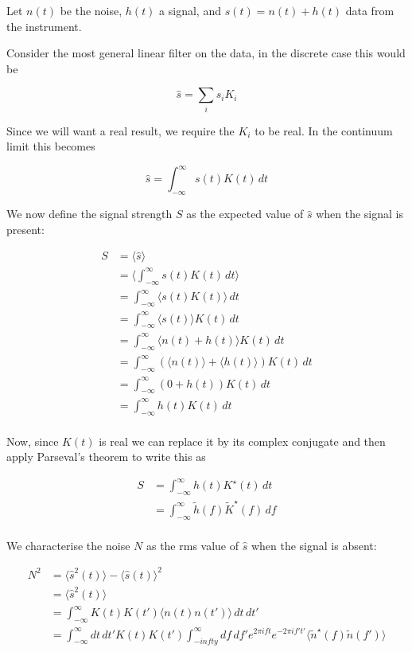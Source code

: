 
Let $n(t)$ be the noise, $h(t)$ a signal, and $s(t)=n(t)+h(t)$ data
from the instrument.

Consider the most general linear filter on the data, in the discrete
case this would be

\begin{equation}
\hat{s} = \sum_i s_i K_i
\end{equation}

Since we will want a real result, we require the $K_i$ to be real.  In
the continuum limit this becomes

\begin{equation}
\hat{s} = \int_{-\infty}^\infty s(t) K(t)\, dt
\end{equation}

We now define the signal strength $S$ as the expected value of
$\hat{s}$ when the signal is present:

\begin{align}
S &= \langle \hat{s} \rangle \\
&= \langle  \int_{-\infty}^\infty s(t) K(t)\, dt \rangle \\
&= \int_{-\infty}^\infty \langle s(t) K(t)\rangle \, dt \\
&= \int_{-\infty}^\infty \langle s(t) \rangle K(t) \, dt \\
&= \int_{-\infty}^\infty \langle n(t) + h(t) \rangle K(t) \, dt \\
&= \int_{-\infty}^\infty \left( \langle n(t) \rangle + \langle h(t)
\rangle \right)  K(t) \, dt \\
&= \int_{-\infty}^\infty \left( 0 + h(t) \right)  K(t) \, dt \\
&= \int_{-\infty}^\infty h(t) K(t) \, dt \\
\end{align}

Now, since $K(t)$ is real we can replace it by its complex conjugate
and then apply Parseval's theorem to write this as

\begin{align}
S &= \int_{-\infty}^\infty h(t) K^\star(t) \, dt \\
&= \int_{-\infty}^\infty \tilde{h}(f) \tilde{K}^\star(f) \, df \\
\end{align}

We characterise the noise $N$ as the rms value of $\hat{s}$ when the
signal is absent:


\begin{align}
N^2 &= \langle \hat{s}^2(t) \rangle - \langle \hat{s}(t) \rangle^2 \\
&= \langle \hat{s}^2(t) \rangle  \\
&= \int_{-\infty}^\infty K(t) K(t') \langle n(t) n(t')
\rangle\,dt\,dt' \\
&= \int_{-\infty}^\infty dt\,dt' K(t) K(t') 
\int_{-infty}^\infty df\,df' e^{2\pi i f t}e^{-2\pi i f' t'} \langle
\tilde{n}^\star(f) \tilde{n}(f')\rangle \\
\end{align}

